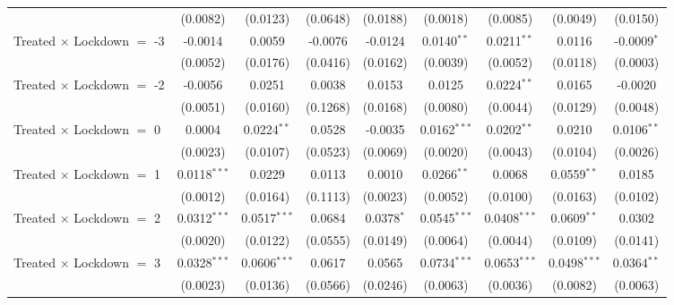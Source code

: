 \begin{tabular}{lcccccccc}
                                     & (0.0082)       & (0.0123)       & (0.0648)      & (0.0188)       & (0.0018)       & (0.0085)       & (0.0049)       & (0.0150)\\   
   Treated $\times$ Lockdown $=$ -3  & -0.0014        & 0.0059         & -0.0076       & -0.0124        & 0.0140$^{**}$  & 0.0211$^{**}$  & 0.0116         & -0.0009$^{*}$\\   
                                     & (0.0052)       & (0.0176)       & (0.0416)      & (0.0162)       & (0.0039)       & (0.0052)       & (0.0118)       & (0.0003)\\   
   Treated $\times$ Lockdown $=$ -2  & -0.0056        & 0.0251         & 0.0038        & 0.0153         & 0.0125         & 0.0224$^{**}$  & 0.0165         & -0.0020\\   
                                     & (0.0051)       & (0.0160)       & (0.1268)      & (0.0168)       & (0.0080)       & (0.0044)       & (0.0129)       & (0.0048)\\   
   Treated $\times$ Lockdown $=$ 0   & 0.0004         & 0.0224$^{**}$  & 0.0528        & -0.0035        & 0.0162$^{***}$ & 0.0202$^{**}$  & 0.0210         & 0.0106$^{**}$\\   
                                     & (0.0023)       & (0.0107)       & (0.0523)      & (0.0069)       & (0.0020)       & (0.0043)       & (0.0104)       & (0.0026)\\   
   Treated $\times$ Lockdown $=$ 1   & 0.0118$^{***}$ & 0.0229         & 0.0113        & 0.0010         & 0.0266$^{**}$  & 0.0068         & 0.0559$^{**}$  & 0.0185\\   
                                     & (0.0012)       & (0.0164)       & (0.1113)      & (0.0023)       & (0.0052)       & (0.0100)       & (0.0163)       & (0.0102)\\   
   Treated $\times$ Lockdown $=$ 2   & 0.0312$^{***}$ & 0.0517$^{***}$ & 0.0684        & 0.0378$^{*}$   & 0.0545$^{***}$ & 0.0408$^{***}$ & 0.0609$^{**}$  & 0.0302\\   
                                     & (0.0020)       & (0.0122)       & (0.0555)      & (0.0149)       & (0.0064)       & (0.0044)       & (0.0109)       & (0.0141)\\   
   Treated $\times$ Lockdown $=$ 3   & 0.0328$^{***}$ & 0.0606$^{***}$ & 0.0617        & 0.0565         & 0.0734$^{***}$ & 0.0653$^{***}$ & 0.0498$^{***}$ & 0.0364$^{**}$\\   
                                     & (0.0023)       & (0.0136)       & (0.0566)      & (0.0246)       & (0.0063)       & (0.0036)       & (0.0082)       & (0.0063)\\   

\end{tabular}
